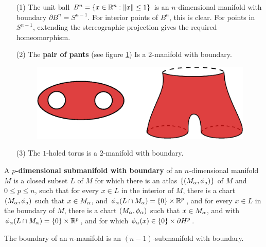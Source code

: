 \begin{example}\label{example_1.3}
    \begin{enumerate}
        \item[(1)] The unit ball $B^n=\{x \in \mathbb{R}^n : \|x\| \leq 1\}$ is an
            $n$-dimensional manifold with boundary  $\partial{B^n}=S^{n-1}$. For
            interior points of $B^n$, this is clear. For points in  $S^{n-1}$,
            extending the stereographic projection gives the required
            homeomorphism.

        \item[(2)] The \textbf{pair of pants} (see figure \ref{fig_1.3}) Is a
            $2$-manifold with boundary.
             \begin{figure}[h]
                \centering
                \includegraphics[scale=0.5]{Figures/Chapter1/pair_of_pants.eps}
                \caption{}
                \label{fig_1.3}
            \end{figure}

        \item[(3)] The $1$-holed torus is a  $2$-manifold with boundary.
    \end{enumerate}
\end{example}

\begin{definition}
    A \textbf{$p$-dimensional submanifold with boundary} of an $n$-dimensional
    manifold  $M$ is a closed subset  $L$ of  $M$ for which there is an atlas
    $\{(M_\alpha,\phi_a)\}$ of $M$ and  $0 \leq p \leq n$, such that for every $x
    \in L$ in the interior of  $M$, there is a chart  $(M_\alpha,\phi_a)$ such that
    $x \in M_\alpha$, and  $\phi_\alpha(L \cap M_\alpha)=\{0\} \times \mathbb{R}^p$, and for every
    $x \in L$ in the boundary of  $M$, there is a chart  $(M_\alpha,\phi_\alpha)$ such
    that $x \in M_\alpha$, and with  $\phi_\alpha(L \cap M_\alpha)=\{0\} \times \mathbb{R}^p$, and
    for which $\phi_\alpha(x) \in \{0\} \times \partial{H^p}$.
\end{definition}

\begin{lemma}\label{1.1.2}
    The boundary of an $n$-manifold is an $(n-1)$-submanifold with boundary.
\end{lemma}

